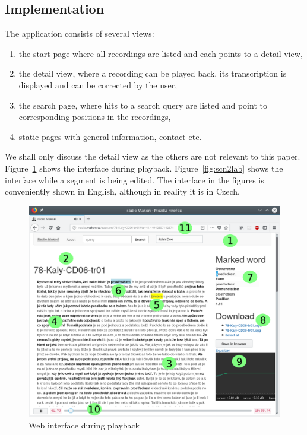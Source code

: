 \documentclass{svproc}
\begin{document}
\subsection{Implementation}

The application consists of several views:
\begin{enumerate}
\item{the start page where all recordings are listed and each points to a detail
view,}
\item{the detail view, where a recording can be played back, its transcription
is displayed and can be corrected by the user,}
\item{the search page, where hits to a search query are listed and point to
corresponding positions in the recordings,}
\item{static pages with general information, contact etc.}
\end{enumerate}

We shall only discuss the detail view as the others are not relevant to this
paper. Figure~\ref{fig:scn1lab} shows the interface during playback.
Figure~\ref{fig:scn2lab} shows the interface while a segment is being edited.
The interface in the figures is conveniently shown in English, although in
reality it is in Czech.

\begin{figure}[htpb]
\includegraphics[scale=0.6]{rc/radio-makon-en-1-lab.png}
\caption{Web interface during playback}
\label{fig:scn1lab}
\end{figure}
\end{document}
